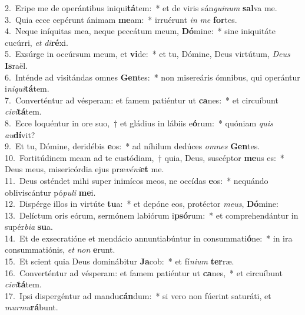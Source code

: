 {2.~}Eripe me de operántibus iniqui\textbf{tá}tem:~* et de viris sán\textit{gui}\textit{num} \textbf{sal}va me.\\
{3.~}Quia ecce cepérunt ánimam \textbf{me}am:~* irruérunt \textit{in} \textit{me} \textbf{for}tes.\\
{4.~}Neque iníquitas mea, neque peccátum meum, \textbf{Dó}mine:~* sine iniquitáte cucúrri, \textit{et} \textit{di}\textbf{ré}xi.\\
{5.~}Exsúrge in occúrsum meum, et \textbf{vi}de:~* et tu, Dómine, Deus virtútum, \textit{De}\textit{us} \textbf{Is}raël.\\
{6.~}Inténde ad visitándas omnes \textbf{Gen}tes:~* non misereáris ómnibus, qui operántur i\textit{ni}\textit{qui}\textbf{tá}tem.\\
{7.~}Converténtur ad vésperam: et famem patiéntur ut \textbf{ca}nes:~* et circuíbunt \textit{ci}\textit{vi}\textbf{tá}tem.\\
{8.~}Ecce loquéntur in ore suo,~† et gládius in lábiis e\textbf{ó}rum:~* quóniam \textit{quis} \textit{au}\textbf{dí}vit?\\
{9.~}Et tu, Dómine, deridébis \textbf{e}os:~* ad níhilum dedúces \textit{om}\textit{nes} \textbf{Gen}tes.\\
{10.~}Fortitúdinem meam ad te custódiam,~† quia, Deus, suscéptor \textbf{me}us es:~* Deus meus, misericórdia ejus præ\textit{vé}\textit{ni}\textbf{et} me.\\
{11.~}Deus osténdet mihi super inimícos meos, ne occídas \textbf{e}os:~* nequándo obliviscántur pó\textit{pu}\textit{li} \textbf{me}i.\\
{12.~}Dispérge illos in virtúte \textbf{tu}a:~* et depóne eos, protéctor \textit{me}\textit{us}, \textbf{Dó}mine:\\
{13.~}Delíctum oris eórum, sermónem labiórum i\textbf{psó}rum:~* et comprehendántur in supér\textit{bi}\textit{a} \textbf{su}a.\\
{14.~}Et de exsecratióne et mendácio annuntiabúntur in consummati\textbf{ó}ne:~* in ira consummatiónis, \textit{et} \textit{non} \textbf{e}runt.\\
{15.~}Et scient quia Deus dominábitur \textbf{Ja}cob:~* et fí\textit{ni}\textit{um} \textbf{ter}ræ.\\
{16.~}Converténtur ad vésperam: et famem patiéntur ut \textbf{ca}nes,~* et circuíbunt \textit{ci}\textit{vi}\textbf{tá}tem.\\
{17.~}Ipsi dispergéntur ad mandu\textbf{cán}dum:~* si vero non fúerint saturáti, et \textit{mur}\textit{mu}\textbf{rá}bunt.\\
